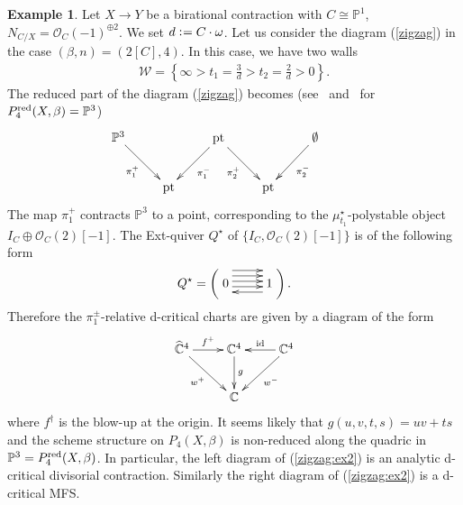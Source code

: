 \documentclass[11pt]{amsart}
\theoremstyle{plain}
\theoremstyle{definition}
\newtheorem{exam}[thm]{Example}
\theoremstyle{remark}
\newcommand{\oO}{\mathcal{O}}
\newcommand{\wW}{\mathcal{W}}
\newcommand{\id}{\textrm{id}}
\begin{document}
\begin{exam}\label{exam:non-irre2}
Let $X \to Y$ be a birational contraction 
with $C \cong \mathbb{P}^1$, 
$N_{C/X}=\oO_{C}(-1)^{\oplus 2}$. 
We set $d \cneq C \cdot \omega$.
Let us consider the diagram (\ref{zigzag})
in the case $(\beta, n)=(2[C], 4)$. In this case, 
we have two walls 
\begin{align*}
\wW=\left\{
\infty>t_1=\frac{3}{d} >t_2=\frac{2}{d} >0
\right\}. 
\end{align*}
The reduced part of the diagram (\ref{zigzag})
becomes (see~\cite[Section~5.3]{Tolim}
and~\cite[Section~4.1]{PT}
for $P_4^{\rm{red}}(X, \beta)=\mathbb{P}^3$)
\begin{align}\label{zigzag:ex2}
\xymatrix{
\mathbb{P}^3
 \ar[rd]_-{\pi_1^+}  &  &  \mathrm{pt}
 \ar[ld]^-{\pi_1^-} \ar[rd]_-{\pi_2^+} &  & 
\emptyset \ar[ld]^-{\pi_2^-}  &  
\\
& \mathrm{pt}  & & \mathrm{pt} & & 
}
\end{align} 
The map $\pi_1^{+}$ contracts 
$\mathbb{P}^3$ to a point, corresponding 
to the $\mu_{t_1}^{\star}$-polystable 
object $I_C \oplus \oO_C(2)[-1]$. 
The Ext-quiver $Q^{\star}$ 
of $\{I_C, \oO_C(2)[-1]\}$
is of the following form
\begin{align*}
Q^{\star}=\left(\xymatrix{
0 \ar@<-0.5ex>[r] \ar@<0.5ex>[r] \ar@<1.5ex>[r] \ar@<2.5ex>[r] 
& 1 \ar@<1.5ex>[l]
}\right). 
\end{align*}
Therefore the 
$\pi_1^{\pm}$-relative d-critical charts 
are given by a diagram of the form
\begin{align*}
\xymatrix{
\widehat{\mathbb{C}}^4 \ar[r]^-{f^{+}} \ar[rd]_-{w^+} 
& \mathbb{C}^4 \ar[d]^-{g} &
\ar[l]_-{\id} \mathbb{C}^4 \ar[ld]^-{w^-}\\
& \mathbb{C} &
}
\end{align*}
where $f^{\dag}$ is the blow-up 
at the origin. 
It seems likely that 
$g(u, v, t, s)=uv+ts$
and the scheme structure 
on $P_4(X, \beta)$ 
is non-reduced 
along the quadric in 
$\mathbb{P}^3=P_4^{\rm{red}}(X, \beta)$.
In particular, the left diagram of (\ref{zigzag:ex2})
is an analytic d-critical divisorial contraction. 
Similarly the right diagram of (\ref{zigzag:ex2})
is a d-critical MFS. 
\end{exam}
\end{document}
